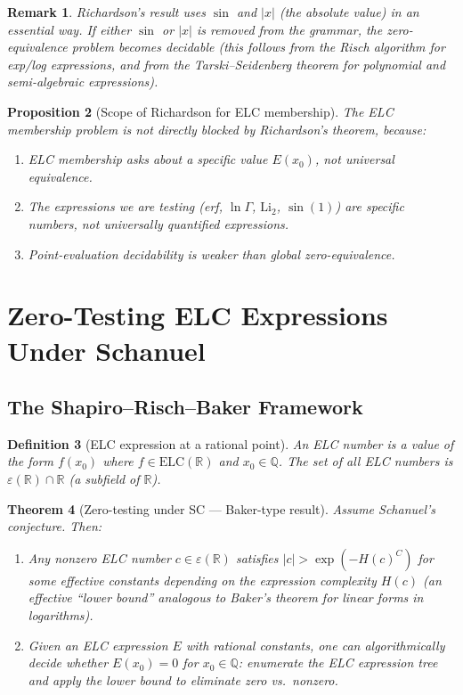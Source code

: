 \documentclass[11pt]{article}
\newtheorem{theorem}{Theorem}
\newtheorem{proposition}[theorem]{Proposition}
\newtheorem{definition}[theorem]{Definition}
\newtheorem{remark}[theorem]{Remark}
\begin{document}
\begin{remark}
Richardson's result uses $\sin$ and $|x|$ (the absolute value) in an essential way.
If either $\sin$ or $|x|$ is removed from the grammar, the zero-equivalence problem
becomes decidable (this follows from the Risch algorithm for exp/log expressions,
and from the Tarski--Seidenberg theorem for polynomial and semi-algebraic expressions).
\end{remark}

\begin{proposition}[Scope of Richardson for ELC membership]
The ELC membership problem is \emph{not} directly blocked by Richardson's theorem,
because:
\begin{enumerate}
  \item ELC membership asks about a specific value $E(x_0)$, not universal equivalence.
  \item The expressions we are testing (erf, $\ln\Gamma$, $\mathrm{Li}_2$, $\sin(1)$)
    are specific numbers, not universally quantified expressions.
  \item Point-evaluation decidability is weaker than global zero-equivalence.
\end{enumerate}
\end{proposition}

\section{Zero-Testing ELC Expressions Under Schanuel}

\subsection{The Shapiro--Risch--Baker Framework}

\begin{definition}[ELC expression at a rational point]
An \emph{ELC number} is a value of the form $f(x_0)$ where $f\in\mathrm{ELC}(\mathbb{R})$
and $x_0\in\mathbb{Q}$. The set of all ELC numbers is $\varepsilon(\mathbb{R})\cap\mathbb{R}$
(a subfield of $\mathbb{R}$).
\end{definition}

\begin{theorem}[Zero-testing under SC --- Baker-type result]
\label{thm:zeroing}
Assume Schanuel's conjecture. Then:
\begin{enumerate}
  \item Any nonzero ELC number $c\in\varepsilon(\mathbb{R})$ satisfies $|c|>\exp(-H(c)^C)$
    for some effective constants depending on the expression complexity $H(c)$
    (an effective ``lower bound'' analogous to Baker's theorem for linear forms in logarithms).
  \item Given an ELC expression $E$ with rational constants, one can algorithmically
    decide whether $E(x_0)=0$ for $x_0\in\mathbb{Q}$: enumerate the ELC expression tree
    and apply the lower bound to eliminate zero vs.\ nonzero.
\end{enumerate}
\end{theorem}
\end{document}
